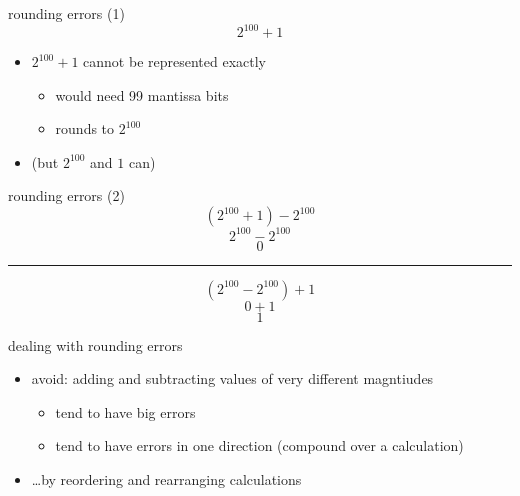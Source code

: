 
\begin{frame}{rounding errors (1)}
\[
2^{100} + 1
\]
\begin{itemize}
\item $2^{100}+1$ cannot be represented exactly
    \begin{itemize}
    \item would need 99 mantissa bits
    \item rounds to $2^{100}$
    \end{itemize}
\item (but $2^{100}$ and $1$ can)
\end{itemize}
\end{frame}

\begin{frame}{rounding errors (2)}
\[
(2^{100} + 1) - 2^{100} 
\]
\[
2^{100} - 2^{100}
\]
\[
0
\]
\vspace{.25cm}
\hrule
\vspace{.25cm}
\[
(2^{100} - 2^{100}) + 1
\]
\[
0 + 1
\]
\[
1
\]
\end{frame}

\begin{frame}{dealing with rounding errors}
    \begin{itemize}
    \item avoid: adding and subtracting values of very different magntiudes
        \begin{itemize}
        \item tend to have big errors
        \item tend to have errors in one direction (compound over a calculation)
        \end{itemize}
    \item \ldots by reordering and rearranging calculations
    \end{itemize}
\end{frame}
